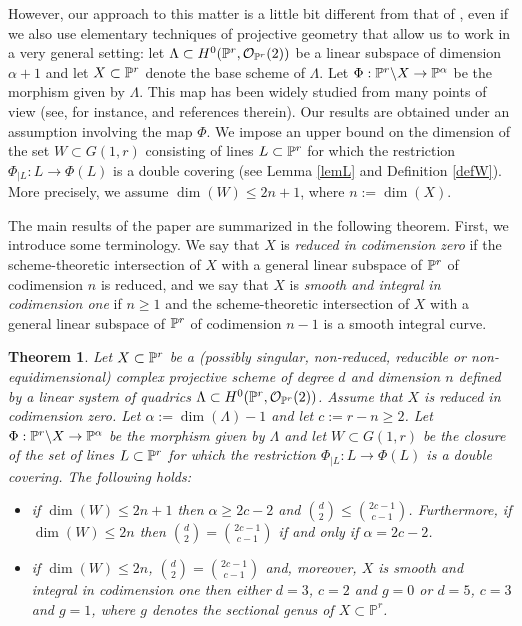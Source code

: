 \documentclass{amsart}
\newtheorem{theorem}{Theorem}
\theoremstyle{definition}
\begin{document}
However, our approach to this matter is a little bit different from
that of \cite{z}, even if we also use elementary techniques of
projective geometry that allow us to work in a very general setting:
let $\Lambda\subset H^{0}(\Bbb{P}^{r},\mathcal{O}_{\Bbb{P}^{r}}(2))$
be a linear subspace of dimension $\alpha +1$ and let
$X\subset\Bbb{P}^{r}$ denote the base scheme of $\Lambda$. Let
$\Phi:\Bbb{P}^{r}\backslash X\to \Bbb{P}^{\alpha}$ be the morphism
given by $\Lambda$. This map has been widely studied from many
points of view (see, for instance, \cite{v} and references therein).
Our results are obtained under an assumption involving the map
$\Phi$. We impose an upper bound on the dimension of the set
$W\subset G(1,r)$ consisting of lines $L\subset\Bbb{P}^{r}$ for
which the restriction $\Phi_{|L}:L\to\Phi(L)$ is a double covering
(see Lemma \ref{lemL} and Definition \ref{defW}). More precisely, we
assume $\dim(W)\leq 2n+1$, where $n:=\dim(X)$.

The main results of the paper are summarized in the following
theorem. First, we introduce some terminology. We say that $X$ is
\emph{reduced in codimension zero} if the scheme-theoretic
intersection of $X$ with a general linear subspace of $\Bbb{P}^{r}$
of codimension $n$ is reduced, and we say that $X$ is \emph{smooth
and integral in codimension one} if $n\geq 1$ and the
scheme-theoretic intersection of $X$ with a general linear subspace
of $\Bbb{P}^{r}$ of codimension $n-1$ is a smooth integral curve.

\begin{theorem}\label{thm:main}
Let $X\subset\Bbb{P}^{r}$ be a (possibly singular, non-reduced,
reducible or non-equidimensional) complex projective scheme of
degree $d$ and dimension $n$ defined by a linear system of quadrics
$\Lambda\subset H^{0}(\Bbb{P}^{r},\mathcal{O}_{\Bbb{P}^{r}}(2))$.
Assume that $X$ is reduced in codimension zero. Let $\alpha:=\dim
(\Lambda)-1$ and let $c:=r-n\geq 2$. Let $\Phi:\Bbb{P}^{r}\backslash
X\to \Bbb{P}^{\alpha}$ be the morphism given by $\Lambda $ and let
$W\subset G(1,r)$ be the closure of the set of lines
$L\subset\Bbb{P}^{r}$ for which the restriction
$\Phi_{|L}:L\to\Phi(L)$ is a double covering. The following holds:
\begin{itemize}
\item[(i)] if $\dim (W)\leq 2n+1$ then $\alpha \geq 2c-2$ and $\binom{d}{2}\leq \binom{2c-1}{c-1}$. Furthermore, if $\dim (W)\leq 2n$ then $\binom{d}{2}=\binom{2c-1}{c-1}$ if and only if $\alpha=2c-2$.
\item[(ii)] if $\dim (W)\leq 2n$, $\binom{d}{2}=\binom{2c-1}{c-1}$ and, moreover, $X$ is smooth and integral in codimension one then
either $d=3$, $c=2$ and $g=0$ or $d=5$, $c=3$ and $g=1$, where $g$
denotes the sectional genus of $X\subset{{\mathbb P}}^r$.
\end{itemize}
\end{theorem}
\end{document}
